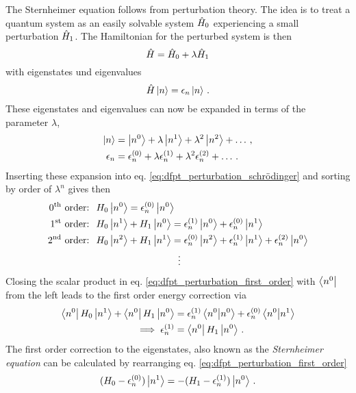 \documentclass[main.tex]{subfiles}
\begin{document}
The Sternheimer equation follows from perturbation theory.
The idea is to treat a quantum system as an easily solvable system \(\hat{H}_0\) experiencing a small perturbation \(\hat{H}_1\).
The Hamiltonian for the perturbed system is then
\begin{equation}
    \hat{H} = \hat{H}_0 + \lambda \hat{H}_1
\end{equation}
with eigenstates und eigenvalues
\begin{equation}\label{eq:dfpt_perturbation_schrödinger}
    \hat{H} \ket{n} = \epsilon_n \ket{n}\,.
\end{equation}
These eigenstates and eigenvalues can now be expanded in terms of the parameter \(\lambda\),
\begin{align}
    \ket{n} &= \ket{n^{0}} + \lambda \ket{n^{1}} + \lambda^2 \ket{n^{2}} + \ldots\,, \\
    \epsilon_n &= \epsilon_n^{(0)} + \lambda \epsilon_n^{(1)} + \lambda^2 \epsilon_n^{(2)} + \ldots\,.
\end{align}
Inserting these expansion into eq. \ref{eq:dfpt_perturbation_schrödinger} and sorting by order of \(\lambda^n\) gives then
\begin{align}
    \text{0\textsuperscript{th} order: }\; &H_0 \ket{n^{0}} = \epsilon_n^{(0)} \ket{n^{0}} \\ 
    \text{1\textsuperscript{st} order: }\; &H_0 \ket{n^{1}} + H_1 \ket{n^{0}} = \epsilon_n^{(1)} \ket{n^{0}} + \epsilon_n^{(0)} \ket{n^{1}} \label{eq:dfpt_perturbation_first_order} \\
    \text{2\textsuperscript{nd} order: }\; &H_0 \ket{n^{2}} + H_1 \ket{n^{1}} = \epsilon_n^{(0)} \ket{n^{2}} + \epsilon_n^{(1)} \ket{n^{1}} + \epsilon_n^{(2)} \ket{n^{0}} \\
    &\hspace{3cm} \vdots \nonumber
\end{align}
Closing the scalar product in eq. \ref{eq:dfpt_perturbation_first_order} with \(\bra{n^{0}}\) from the left leads to the first order energy correction via
\begin{align}
    \bra{n^{0}} H_0 \ket{n^{1}} + \bra{n^{0}} H_1 \ket{n^{0}} &= \epsilon_n^{(1)} \bra{n^{0}} \ket{n^{0}} + \epsilon_n^{(0)} \bra{n^{0}} \ket{n^{1}} \\
    \implies \epsilon_n^{(1)} &= \bra{n^{0}} H_1 \ket{n^{0}}\,.
\end{align}
The first order correction to the eigenstates, also known as the \emph{Sternheimer equation} can be calculated by rearranging eq. \ref{eq:dfpt_perturbation_first_order}
\begin{equation}\label{eq:dfpt_sternheimer}
    (H_0 - \epsilon_n^{(0)}) \ket{n^1} = -(H_1 - \epsilon_n^{(1)}) \ket{n^0}\,.
\end{equation}
\end{document}
